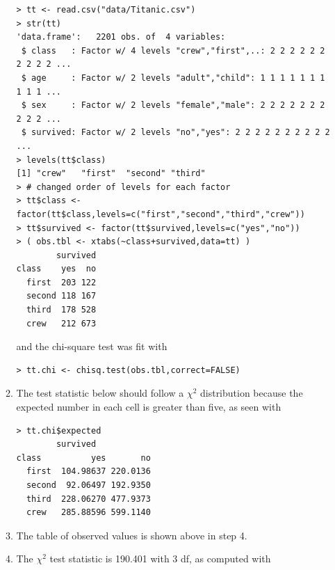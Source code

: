 \documentclass[10pt,openany]{book}\usepackage[]{graphicx}\usepackage[]{color}
\makeatletter
\newenvironment{kframe}{%
 \def\at@end@of@kframe{}%
 \ifinner\ifhmode%
  \def\at@end@of@kframe{\end{minipage}}%
  \begin{minipage}{\columnwidth}%
 \fi\fi%
 \def\FrameCommand##1{\hskip\@totalleftmargin \hskip-\fboxsep
 \colorbox{shadecolor}{##1}\hskip-\fboxsep
     \hskip-\linewidth \hskip-\@totalleftmargin \hskip\columnwidth}%
 \MakeFramed {\advance\hsize-\width
   \@totalleftmargin\z@ \linewidth\hsize
   \@setminipage}}%
 {\par\unskip\endMakeFramed%
 \at@end@of@kframe}
\newenvironment{knitrout}{}{} %
\makeatother
\begin{document}
\begin{itemize}
\begin{enumerate}
\begin{knitrout}
\color{fgcolor}\begin{kframe}
\begin{verbatim}
> tt <- read.csv("data/Titanic.csv")
> str(tt)
'data.frame':	2201 obs. of  4 variables:
 $ class   : Factor w/ 4 levels "crew","first",..: 2 2 2 2 2 2 2 2 2 2 ...
 $ age     : Factor w/ 2 levels "adult","child": 1 1 1 1 1 1 1 1 1 1 ...
 $ sex     : Factor w/ 2 levels "female","male": 2 2 2 2 2 2 2 2 2 2 ...
 $ survived: Factor w/ 2 levels "no","yes": 2 2 2 2 2 2 2 2 2 2 ...
> levels(tt$class)
[1] "crew"   "first"  "second" "third" 
> # changed order of levels for each factor
> tt$class <- factor(tt$class,levels=c("first","second","third","crew"))
> tt$survived <- factor(tt$survived,levels=c("yes","no"))
> ( obs.tbl <- xtabs(~class+survived,data=tt) )
        survived
class    yes  no
  first  203 122
  second 118 167
  third  178 528
  crew   212 673
\end{verbatim}
\end{kframe}
\end{knitrout}
and the chi-square test was fit with
\begin{knitrout}
\color{fgcolor}\begin{kframe}
\begin{verbatim}
> tt.chi <- chisq.test(obs.tbl,correct=FALSE)
\end{verbatim}
\end{kframe}
\end{knitrout}
      \item The test statistic below should follow a $\chi^{2}$ distribution because the expected number in each cell is greater than five, as seen with
\begin{knitrout}
\color{fgcolor}\begin{kframe}
\begin{verbatim}
> tt.chi$expected
        survived
class          yes       no
  first  104.98637 220.0136
  second  92.06497 192.9350
  third  228.06270 477.9373
  crew   285.88596 599.1140
\end{verbatim}
\end{kframe}
\end{knitrout}
      \item The table of observed values is shown above in step 4.
      \item The $\chi^{2}$ test statistic is 190.401 with 3 df, as computed with

\end{enumerate}
\end{itemize}
\end{document}
